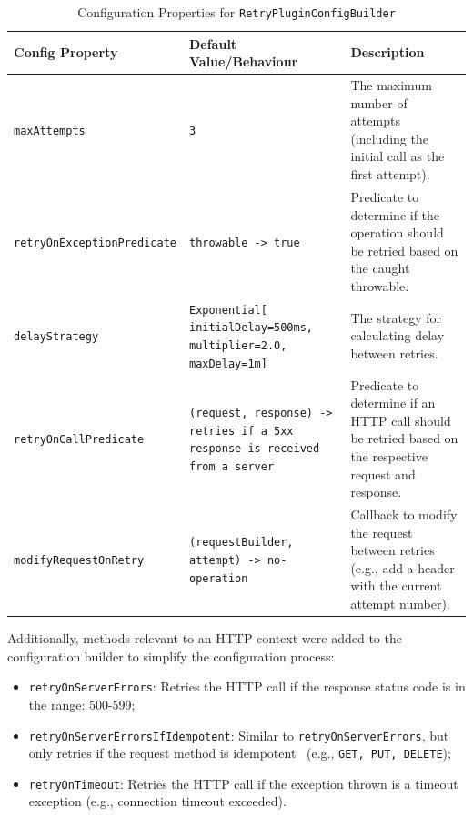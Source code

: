 \begin{table}[!htb]
    \centering
    \caption{Configuration Properties for \texttt{RetryPluginConfigBuilder}}
    \label{tab:retry-ktor-config-builder}
    \vspace{0.3cm}
    \begin{tabular}{|l|p{5cm}|p{6cm}|}
        \hline
        \textbf{Config Property}           & \textbf{Default Value/Behaviour}                                                    & \textbf{Description}                                                                                   \\ \hline
        \texttt{maxAttempts}               & \texttt{3}                                                                          & The maximum number of attempts (including the initial call as the first attempt).                      \\ \hline
        \texttt{retryOnExceptionPredicate} & \texttt{throwable -> true}                                                          & Predicate to determine if the operation should be retried based on the caught throwable.               \\ \hline
        \texttt{delayStrategy}             & \texttt{Exponential[ initialDelay=500ms, multiplier=2.0, maxDelay=1m]}          & The strategy for calculating delay between retries.                                             \\ \hline
        \texttt{retryOnCallPredicate}      & \texttt{(request, response) -> retries if a 5xx response is received from a server} & Predicate to determine if an HTTP call should be retried based on the respective request and response. \\ \hline
        \texttt{modifyRequestOnRetry}      & \texttt{(requestBuilder, attempt) -> no-operation} & Callback to modify the request between retries (e.g., add a header with the current attempt number). \\ \hline
    \end{tabular}
\end{table}

Additionally, methods relevant to an HTTP context were added to the configuration builder to simplify the configuration process:

\begin{itemize}
    \item \texttt{retryOnServerErrors}: Retries the HTTP call if the response status code is in the range: 500-599;
    \item \texttt{retryOnServerErrorsIfIdempotent}: Similar to \texttt{retryOnServerErrors}, but only retries if the request method is idempotent~\cite{idempotent-http-method} (e.g., \texttt{GET, PUT, DELETE});
    \item \texttt{retryOnTimeout}: Retries the HTTP call if the exception thrown is a timeout exception (e.g., connection timeout exceeded).
\end{itemize}
